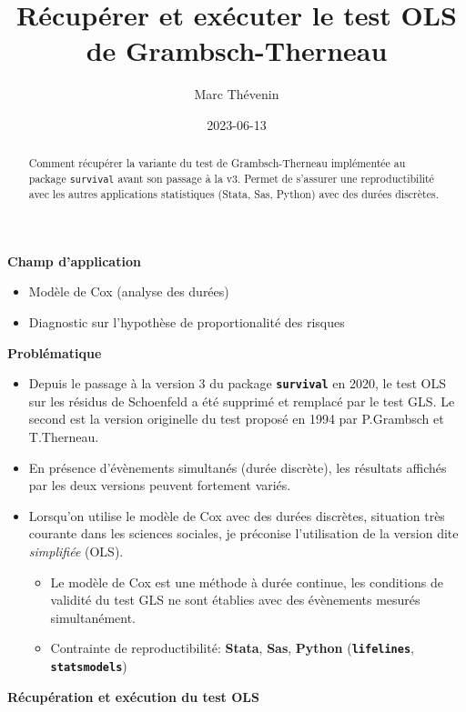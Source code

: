\documentclass[
  letterpaper,
  DIV=11,
  numbers=noendperiod]{scrartcl}
\title{Récupérer et exécuter le test OLS de Grambsch-Therneau}
\author{Marc Thévenin}
\date{2023-06-13}
\providecommand{\tightlist}{%
  \setlength{\itemsep}{0pt}\setlength{\parskip}{0pt}}\usepackage{longtable,booktabs,array}
\begin{document}
\maketitle
\begin{abstract}
Comment récupérer la variante du test de Grambsch-Therneau implémentée
au package \texttt{survival} avant son passage à la v3. Permet de
s'assurer une reproductibilité avec les autres applications statistiques
(Stata, Sas, Python) avec des durées discrètes.
\end{abstract}
\textbf{Champ d'application}

\begin{itemize}
\tightlist
\item
  Modèle de Cox (analyse des durées)\\
\item
  Diagnostic sur l'hypothèse de proportionalité des risques
\end{itemize}

\textbf{Problématique}

\begin{itemize}
\tightlist
\item
  Depuis le passage à la version 3 du package \textbf{\texttt{survival}}
  en 2020, le test OLS sur les résidus de Schoenfeld a été supprimé et
  remplacé par le test GLS. Le second est la version originelle du test
  proposé en 1994 par P.Grambsch et T.Therneau.
\item
  En présence d'évènements simultanés (durée discrète), les résultats
  affichés par les deux versions peuvent fortement variés.
\item
  Lorsqu'on utilise le modèle de Cox avec des durées discrètes,
  situation très courante dans les sciences sociales, je préconise
  l'utilisation de la version dite \emph{simplifiée} (OLS).

  \begin{itemize}
  \tightlist
  \item
    Le modèle de Cox est une méthode à durée continue, les conditions de
    validité du test GLS ne sont établies avec des évènements mesurés
    simultanément.
  \item
    Contrainte de reproductibilité: \textbf{Stata}, \textbf{Sas},
    \textbf{Python} (\textbf{\texttt{lifelines}},
    \textbf{\texttt{statsmodels}})
  \end{itemize}
\end{itemize}

\textbf{Récupération et exécution du test OLS}
\end{document}
